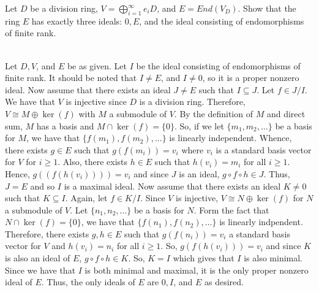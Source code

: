 Let $D$ be a division ring, $V =\bigoplus_{i=1}^{\infty}e_iD$, and $E=End(V_D)$. Show that the ring $E$
has exactly three ideals: $0, E$, and the ideal consisting of endomorphisms of finite rank.\\

\begin{solution}\renewcommand{\qedsymbol}{}\ \\
    Let $D, V$, and $E$ be as given. Let $I$ be the ideal consisting of endomorphisms of finite rank. It
    should be noted that $I\neq E$, and $I\neq0$, so it is a proper nonzero ideal. Now assume that there
    exists an ideal $J\neq E$ such that $I\subseteq J$. Let $f\in J/I$. We have that $V$ is injective
    since $D$ is a division ring. Therefore, $V\cong M\oplus\ker(f)$ with $M$ a submodule of $V$. By the
    definition of $M$ and direct sum, $M$ has a basis and $M\cap\ker(f)=\{0\}$. So, if we let
    $\{m_1,m_2,\ldots\}$ be a basis for $M$, we have that $\{f(m_1),f(m_2),\ldots\}$ is linearly
    independent. Whence, there exists $g\in E$ such that $g(f(m_i))=v_i$ where $v_i$ is a standard basis
    vector for $V$ for $i\geq1$. Also, there exists $h\in E$ such that $h(v_i)=m_i$ for all $i\geq1$.
    Hence, $g((f(h(v_i))))=v_i$ and since $J$ is an ideal, $g\circ f\circ h\in J$. Thus, $J=E$ and so
    $I$ is a maximal ideal. Now assume that there exists an ideal $K\neq0$ such that $K\subseteq I$.
    Again, let $f\in K/I$. Since $V$ is injective, $V\cong N\oplus\ker(f)$ for $N$ a submodule of $V$.
    Let $\{n_1,n_2,\ldots\}$ be a basis for $N$. Form the fact that $N\cap\ker(f)=\{0\}$, we have that
    $\{f(n_1),f(n_2),\ldots\}$ is linearly indpendent. Therefore, there exists $g,h\in E$ such that
    $g(f(n_i))=v_i$ a standard basis vector for $V$ and $h(v_i)=n_i$ for all $i\geq1$. So,
    $g(f(h(v_i)))=v_i$ and since $K$ is also an ideal of $E$, $g\circ f\circ h\in K$. So, $K=I$ which
    gives that $I$ is also minimal. Since we have that $I$ is both minimal and maximal, it is the only
    proper nonzero ideal of $E$. Thus, the only ideals of $E$ are $0, I$, and $E$ as desired.

\end{solution}